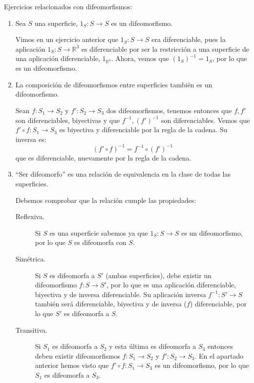 \begin{ejercicio}
    Ejercicios relacionados con difeomorfismos:
    \begin{enumerate}
        \item Sea $S$ una superficie, $1_S:S\to S$ es un difeomorfismo.

            Vimos en un ejercicio anterior que $1_S:S\to S$ era diferenciable, pues la aplicación $1_S:S\to\mathbb{R}^3$ es diferenciable por ser la restricción a una superficie de una aplicación diferenciable, $1_{\mathbb{R}^3}$. Ahora, vemos que ${(1_S)}^{-1}=1_S$, por lo que es un difeomorfismo.

        \item La composición de difeomorfismos entre superficies también es un difeomorfismo.

            Sean $f:S_1\to S_2$ y $f':S_2\to S_3$ dos difeomorfismos, tenemos entonces que $f,f'$ son diferenciables, biyectivas y que $f^{-1},{(f')}^{-1}$ son diferenciables. Vemos que $f'\circ f:S_1\to S_3$ es biyectiva y diferenciable por la regla de la cadena. Su inversa es:
            \begin{equation*}
                {(f'\circ f)}^{-1} = f^{-1}\circ {(f')}^{-1}
            \end{equation*}
            que es diferenciable, nuevamente por la regla de la cadena.
        \item ``Ser difeomorfo'' es una relación de equivalencia en la clase de todas las superficies.

            Debemos comprobar que la relación cumple las propiedades:
            \begin{description}
                \item [Reflexiva.] Si $S$ es una superficie sabemos ya que $1_S:S\to S$ es un difeomorfismo, por lo que $S$ es difeomorfa con $S$.
                \item [Simétrica.] Si $S$ es difeomorfa a $S'$ (ambas superficies), debe existir un difeomorfismo $f:S\to S'$, por lo que es una aplicación diferenciable, biyectiva y de inversa diferenciable. Su aplicación inversa $f^{-1}:S'\to S$ también será diferenciable, biyectiva y de inversa ($f$) diferenciable, por lo que $S'$ es difeomorfa a $S$.
                \item [Transitiva.] Si $S_1$ es difeomorfa a $S_2$ y esta última es difeomorfa a $S_3$ entonces deben existir difeomorfismos $f:S_1\to S_2$ y $f':S_2\to S_3$. En el apartado anterior hemos visto que $f'\circ f:S_1\to S_3$ es un difeomorfismo, por lo que $S_1$ es difeomorfa a $S_3$.
            \end{description}
    \end{enumerate}
\end{ejercicio}


